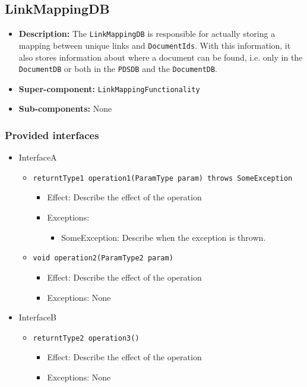 \documentclass[a4paper,10pt]{article}
\begin{document}
\subsection{LinkMappingDB}
\begin{itemize}
    \item \textbf{Description:} The \texttt{LinkMappingDB} is responsible for actually storing a mapping between unique links and \texttt{DocumentIds}. With this information, it also stores information about where a document can be found, i.e. only in the \texttt{DocumentDB} or both in the \texttt{PDSDB} and the \texttt{DocumentDB}.
    \item \textbf{Super-component:} \texttt{LinkMappingFunctionality}
    \item \textbf{Sub-components:} None
\end{itemize}

\subsubsection*{Provided interfaces}
\begin{itemize}
    \item InterfaceA
    \begin{itemize}
        \item \texttt{returntType1 operation1(ParamType param) throws SomeException}
        \begin{itemize}
            \item Effect: Describe the effect of the operation
            \item Exceptions:
            \begin{itemize}
                \item SomeException: Describe when the exception is thrown.
            \end{itemize}
		\end{itemize}
        \item \texttt{void operation2(ParamType2 param)}
        \begin{itemize}
            \item Effect: Describe the effect of the operation
            \item Exceptions: None
        \end{itemize}
    \end{itemize}

    \item InterfaceB
    \begin{itemize}
        \item \texttt{returntType2 operation3()}
        \begin{itemize}
            \item Effect: Describe the effect of the operation
            \item Exceptions: None
        \end{itemize}
    \end{itemize}
\end{itemize}
\end{document}

